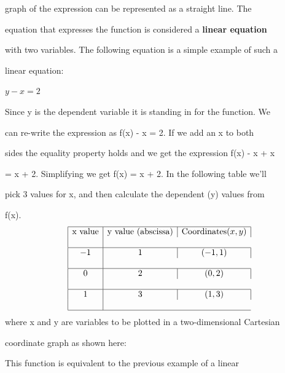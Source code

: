graph of the expression can be represented as a straight line. The

equation that expresses the function is considered a \textbf{linear equation}

with two variables. The following equation is a simple example of such a

linear equation:







$y - x = 2 \,$







Since y is the dependent variable it is standing in for the function. We

can re-write the expression as f(x) - x = 2. If we add an x to both

sides the equality property holds and we get the expression f(x) - x + x

= x + 2. Simplifying we get f(x) = x + 2. In the following table we'll

pick 3 values for x, and then calculate the dependent (y) values from

f(x).
$$
\begin{array}{|c|c|c|}

\hline

\text{x value} & \text{y value (abscissa)} & \text{Coordinates} (x,y) \\\\ \hline

-1 & 1 & (-1,1) \\\\ \hline

0 & 2 & (0,2) \\\\ \hline

1 & 3 & (1,3) \\\\ \hline

\end{array}
$$
where x and y are variables to be plotted in a two-dimensional Cartesian

coordinate graph as shown here:









This function is equivalent to the previous example of a linear

